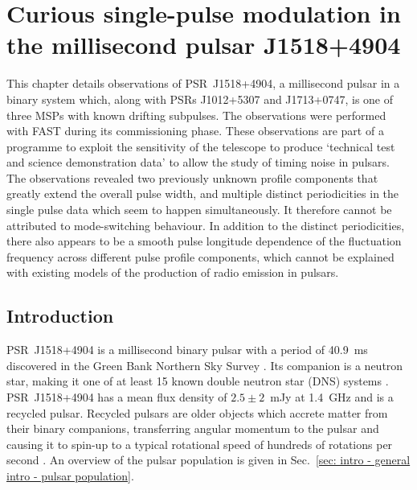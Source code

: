 \chapter[FAST observations of an MSP]{Curious single-pulse modulation in the millisecond pulsar J1518+4904}
\label{chapt: J1518}

This chapter details observations of PSR~J1518+4904, a millisecond pulsar in a binary system which, along with PSRs J1012+5307 and J1713+0747, is one of three MSPs with known drifting subpulses. The observations were performed with FAST during its commissioning phase. These observations are part of a programme to exploit the sensitivity of the telescope to produce `technical test and science demonstration data' to allow the study of timing noise in pulsars. The observations revealed two previously unknown profile components that greatly extend the overall pulse width, and multiple distinct periodicities in the single pulse data which seem to happen simultaneously. It therefore cannot be attributed to mode-switching behaviour. In addition to the distinct periodicities, there also appears to be a smooth pulse longitude dependence of the fluctuation frequency across different pulse profile components, which cannot be explained with existing models of the production of radio emission in pulsars.

\section{Introduction}
\label{sec: J1518 - intro}

PSR~J1518+4904 is a millisecond binary pulsar with a period of 40.9~ms discovered in the Green Bank Northern Sky Survey \citep{NSTx1996,SNTx1997}. Its companion is a neutron star, making it one of at least 15 known double neutron star (DNS) systems \citep{TKF+2017}. PSR~J1518+4904 has a mean flux density of $2.5\pm2$~mJy at 1.4~GHz \citep{LKG+2016} and is a recycled pulsar. Recycled pulsars are older objects which accrete matter from their binary companions, transferring angular momentum to the pulsar and causing it to spin-up to a typical rotational speed of hundreds of rotations per second \citep[e.g.][]{PulsarAstronomy}. An overview of the pulsar population is given in Sec.~\ref{sec: intro - general intro - pulsar population}.%

